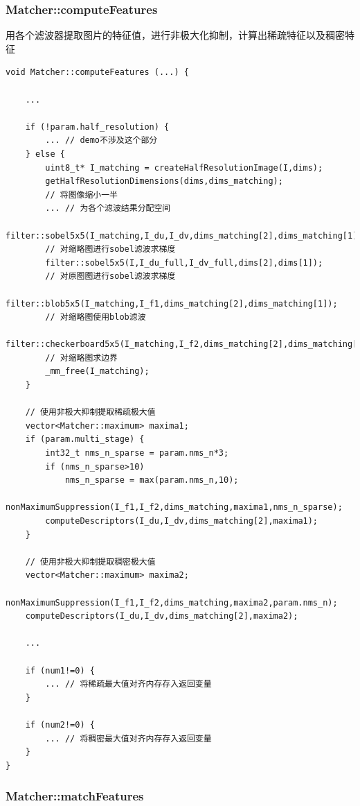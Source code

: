 \documentclass[UTF8]{ctexart}
\begin{document}
    \subsubsection{Matcher::computeFeatures}
    用各个滤波器提取图片的特征值，进行非极大化抑制，计算出稀疏特征以及稠密特征
    \begin{verbatim}
void Matcher::computeFeatures (...) {
  
    ...

    if (!param.half_resolution) {
        ... // demo不涉及这个部分
    } else {
        uint8_t* I_matching = createHalfResolutionImage(I,dims);
        getHalfResolutionDimensions(dims,dims_matching);
        // 将图像缩小一半
        ... // 为各个滤波结果分配空间
        filter::sobel5x5(I_matching,I_du,I_dv,dims_matching[2],dims_matching[1]);
        // 对缩略图进行sobel滤波求梯度
        filter::sobel5x5(I,I_du_full,I_dv_full,dims[2],dims[1]);
        // 对原图图进行sobel滤波求梯度
        filter::blob5x5(I_matching,I_f1,dims_matching[2],dims_matching[1]);
        // 对缩略图使用blob滤波
        filter::checkerboard5x5(I_matching,I_f2,dims_matching[2],dims_matching[1]);
        // 对缩略图求边界
        _mm_free(I_matching);
    }
    
    // 使用非极大抑制提取稀疏极大值
    vector<Matcher::maximum> maxima1;
    if (param.multi_stage) {
        int32_t nms_n_sparse = param.nms_n*3;
        if (nms_n_sparse>10)
            nms_n_sparse = max(param.nms_n,10);
        nonMaximumSuppression(I_f1,I_f2,dims_matching,maxima1,nms_n_sparse);
        computeDescriptors(I_du,I_dv,dims_matching[2],maxima1);
    }
    
    // 使用非极大抑制提取稠密极大值
    vector<Matcher::maximum> maxima2;
    nonMaximumSuppression(I_f1,I_f2,dims_matching,maxima2,param.nms_n);
    computeDescriptors(I_du,I_dv,dims_matching[2],maxima2);

    ...

    if (num1!=0) {
        ... // 将稀疏最大值对齐内存存入返回变量
    }
    
    if (num2!=0) {
        ... // 将稠密最大值对齐内存存入返回变量
    }
}

    \end{verbatim}
    \subsubsection{Matcher::matchFeatures}
    
\end{document}
